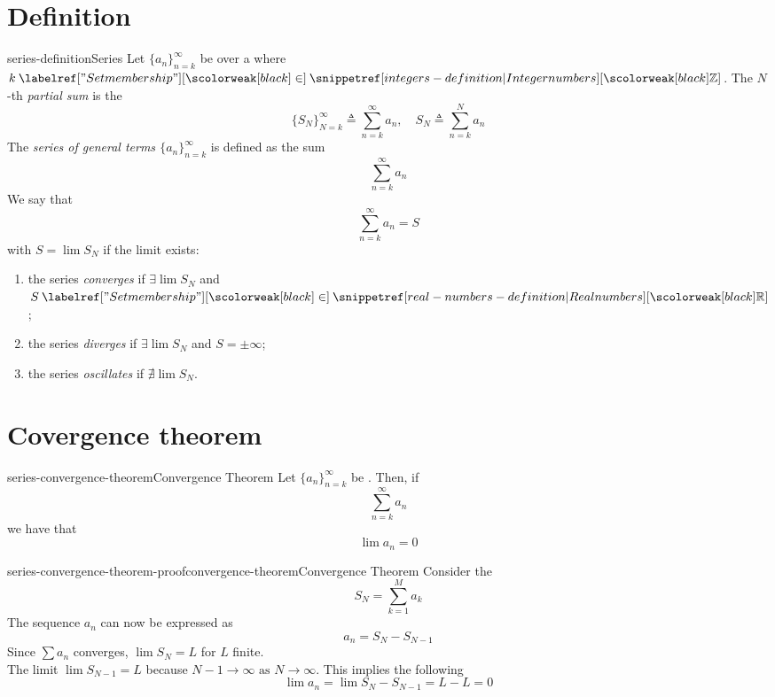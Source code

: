 \documentclass[preview]{standalone}
\begin{document}
\genpage

\section{Definition}

\begin{snippetdefinition}{series-definition}{Series}
    Let \(\{a_n\}_{n=k}^\infty\) be \sequence over a \field where \(k\in\integers\).
    The \(N\)-th \emph{partial sum} is the \sequence
    \[
        \{S_N\}_{N=k}^\infty \triangleq \sum_{n=k}^\infty a_n, \quad
        S_N \triangleq \sum_{n=k}^N a_n
    \]
    The \emph{series of general terms \(\{a_n\}_{n=k}^\infty\)} is defined as the sum
    \[
        \sum_{n=k}^\infty a_n
    \]
    We say that
    \[
        \sum_{n=k}^\infty a_n = S
    \]
    with \(S=\lim S_N\) if the limit exists:
    \begin{enumerate}
        \item the series \emph{converges} if \(\exists \lim S_N\) and \(S\in\realnumbers\);
        \item the series \emph{diverges} if \(\exists \lim S_N\) and \(S=\pm\infty\);
        \item the series \emph{oscillates} if \(\nexists \lim S_N\).
    \end{enumerate}
\end{snippetdefinition}


\section{Covergence theorem}

\begin{snippettheorem}{series-convergence-theorem}{Convergence Theorem}
    Let \(\{a_n\}_{n=k}^\infty\) be \sequence.
    Then, if \[\sum_{n=k}^\infty a_n\] \seriesconverges
    we have that \[\lim a_n=0\]
\end{snippettheorem}

\begin{snippetproof}{series-convergence-theorem-proof}{convergence-theorem}{Convergence Theorem}
    Consider the \partialsum
    \[
        S_N = \sum_{k=1}^{M}a_k
    \]
    The sequence \(a_n\) can now be expressed as
    \[
        a_n = S_N - S_{N-1}
    \]
    Since \(\sum a_n\) converges, \(\lim S_N=L\) for \(L\) finite. \\
    The limit \(\lim S_{N-1}=L\) because \(N-1 \to \infty \text{ as } N \to \infty\).
    This implies the following
    \[
        \lim a_n = \lim S_N - S_{N-1} = L - L = 0
    \]
\end{snippetproof}
\end{document}
